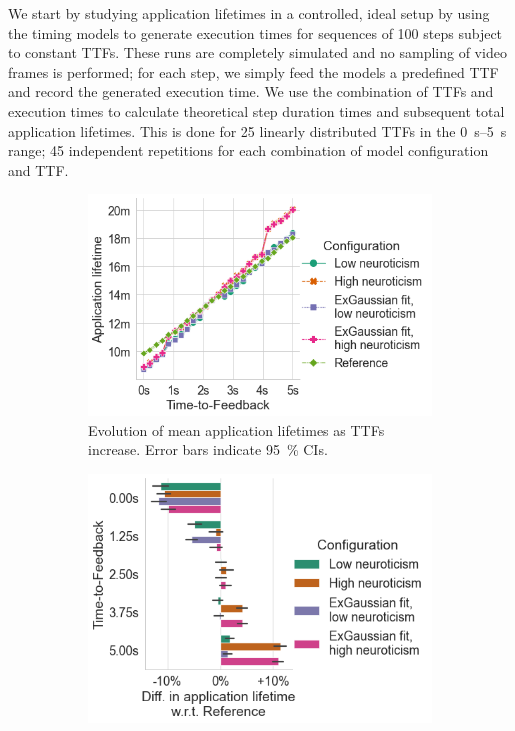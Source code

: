 We start by studying application lifetimes in a controlled, ideal setup by using the timing models to generate execution times for sequences of \num{100} steps subject to constant \glspl{TTF}.
These runs are completely simulated and no sampling of video frames is performed; for each step, we simply feed the models a predefined \gls{TTF} and record the generated execution time.
We use the combination of \glspl{TTF} and execution times to calculate theoretical step duration times and subsequent total application lifetimes.
This is done for \num{25} linearly distributed \glspl{TTF} in the \SIrange[]{0}{5}{\second} range; \num{45} independent repetitions for each combination of model configuration and \gls{TTF}.

\begin{figure}
    \centering
    \begin{subfigure}[t]{.45\textwidth}
        \centering
        \includegraphics[width=\textwidth]{figs/new_model/lifetime_all_ttfs.png}
        \caption{%
            Evolution of mean application lifetimes as \glspl{TTF} increase.
            Error bars indicate \SI{95}{\percent} \glspl{CI}.
        }
    \end{subfigure}%
    \hfill%
    \begin{subfigure}[t]{.45\textwidth}
        \centering
        \includegraphics[width=\textwidth]{figs/new_model/lifetime_diff.png}

\end{subfigure}
\end{figure}
